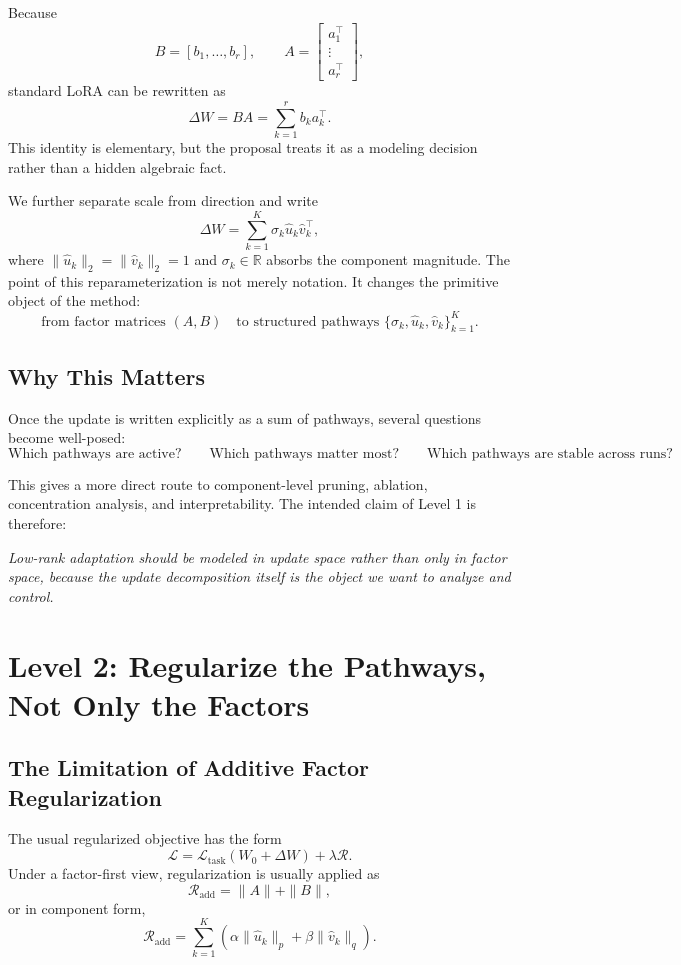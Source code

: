 \documentclass[11pt]{article}
\begin{document}
Because
\[
B = [b_1,\dots,b_r], \qquad
A =
\begin{bmatrix}
a_1^\top \\
\vdots \\
a_r^\top
\end{bmatrix},
\]
standard LoRA can be rewritten as
\[
\Delta W = BA = \sum_{k=1}^{r} b_k a_k^\top.
\]
This identity is elementary, but the proposal treats it as a modeling decision rather than a hidden algebraic fact.

We further separate scale from direction and write
\[
\Delta W = \sum_{k=1}^{K} \sigma_k \hat{u}_k \hat{v}_k^\top,
\]
where $\|\hat{u}_k\|_2 = \|\hat{v}_k\|_2 = 1$ and $\sigma_k \in \mathbb{R}$ absorbs the component magnitude. The point of this reparameterization is not merely notation. It changes the primitive object of the method:
\[
\text{from factor matrices } (A,B) \quad \text{to structured pathways } \{\sigma_k,\hat{u}_k,\hat{v}_k\}_{k=1}^{K}.
\]

\subsection{Why This Matters}

Once the update is written explicitly as a sum of pathways, several questions become well-posed:
\[
\text{Which pathways are active?}\qquad
\text{Which pathways matter most?}\qquad
\text{Which pathways are stable across runs?}
\]

This gives a more direct route to component-level pruning, ablation, concentration analysis, and interpretability. The intended claim of Level 1 is therefore:

\emph{Low-rank adaptation should be modeled in update space rather than only in factor space, because the update decomposition itself is the object we want to analyze and control.}

\section{Level 2: Regularize the Pathways, Not Only the Factors}

\subsection{The Limitation of Additive Factor Regularization}

The usual regularized objective has the form
\[
\mathcal{L}
=
\mathcal{L}_{\text{task}}(W_0+\Delta W)
+ \lambda \mathcal{R}.
\]
Under a factor-first view, regularization is usually applied as
\[
\mathcal{R}_{\text{add}}
=
\|A\| + \|B\|,
\]
or in component form,
\[
\mathcal{R}_{\text{add}}
=
\sum_{k=1}^{K}
\left(
\alpha \|\hat{u}_k\|_p + \beta \|\hat{v}_k\|_q
\right).
\]
\end{document}
